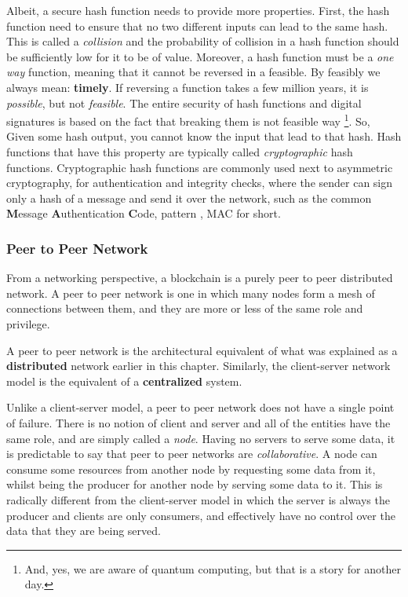 Albeit, a secure hash function needs to provide more properties. First, the hash function need to
ensure that no two different inputs can lead to the same hash. This is called a \textit{collision}
and the probability of collision in a hash function should be sufficiently low for it to be of
value. Moreover, a hash function must be a \textit{one way} function, meaning that it cannot be
reversed in a feasible. By feasibly we always mean: \textbf{timely}. If reversing a function takes a
few million years, it is \textit{possible}, but not \textit{feasible}. The entire security of hash
functions and digital signatures is based on the fact that breaking them is not feasible way
\footnote{And, yes, we are aware of quantum computing, but that is a story for another day.}. So,
Given some hash output, you cannot know the input that lead to that hash. Hash functions that have
this property are typically called \textit{cryptographic} hash functions. Cryptographic hash
functions are commonly used next to asymmetric cryptography, for authentication and integrity
checks, where the sender can sign only a hash of a message and send it over the network, such as the
common \textbf{M}essage \textbf{A}uthentication \textbf{C}ode, pattern
\cite{bellareKeyingHashFunctions1996}, MAC for short.

\subsubsection{Peer to Peer Network} \label{chap_bg:subsec:p2p}

From a networking perspective, a blockchain is a purely peer to peer distributed network. A peer to
peer network is one in which many nodes form a mesh of connections between them, and they are more
or less of the same role and privilege.

\begin{remark}
	A peer to peer network is the architectural equivalent of what was explained as a
	\textbf{distributed} network earlier in this chapter. Similarly, the client-server network model
	is the equivalent of a \textbf{centralized} system.
\end{remark}


Unlike a client-server model, a peer to peer network does not have a single point of failure. There
is no notion of client and server and all of the entities have the same role, and are simply called
a \textit{node}. Having no servers to serve some data, it is predictable to say that peer to peer
networks are \textit{collaborative}. A node can consume some resources from another node by
requesting some data from it, whilst being the producer for another node by serving some data to it.
This is radically different from the client-server model in which the server is always the producer
and clients are only consumers, and effectively have no control over the data that they are being
served.

